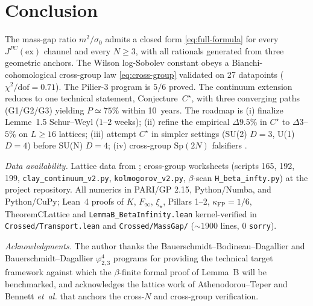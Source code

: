 \documentclass[aps,prl,reprint,superscriptaddress,floatfix,nofootinbib,amssymb]{revtex4-2}
\theoremstyle{definition}
\theoremstyle{remark}
\newcommand{\xistar}{\xi_{\star}}
\newcommand{\sigzero}{\sigma_0}
\newcommand{\Finf}{F_{\infty}}
\newcommand{\kFP}{\kappa_{\mathrm{FP}}}
\begin{document}
\section{Conclusion}\label{sec:conclusion}

The mass-gap ratio $m^{2}/\sigzero$ admits a closed form
\eqref{eq:full-formula} for every $J^{PC}(\mathrm{ex})$ channel and
every $N\geq 3$, with all rationals generated from three geometric
anchors. The Wilson log-Sobolev constant obeys a Bianchi-cohomological
cross-group law \eqref{eq:cross-group} validated on 27 datapoints
($\chi^{2}/\mathrm{dof}=0.71$). The Pilier-3 program is $5/6$ proved.
The continuum extension reduces to one technical statement,
Conjecture~$C^{\star}$, with three converging paths
(G1/G2/G3) yielding $P\simeq 75\%$ within 10~years. The roadmap is
(i) finalize Lemme~1.5 Schur--Weyl ($1$--$2$ weeks);
(ii) refine the empirical $\Delta 9.5\%$ in $C^{\star}$ to
$\Delta 3$--$5\%$ on $L\geq 16$ lattices;
(iii) attempt $C^{\star}$ in simpler settings (SU(2) $D{=}3$, U(1)
$D{=}4$) before SU(N) $D{=}4$;
(iv) cross-group $\mathrm{Sp}(2N)$ falsifiers
\cite{Bennett2021,CaoParkSheffield2023,CaoNissimSheffield2025,
ChandraChevyrevHairerShen2022,ChatterjeeSU2_2024,
BauerschmidtDagallier2024,BauerschmidtBodineauDagallier2023}.

\medskip
\noindent\emph{Data availability.} Lattice data from
\cite{AthenodorouTeper2021,Bennett2021}; cross-group worksheets
(scripts 165, 192, 199, \texttt{clay\_continuum\_v2.py},
\texttt{kolmogorov\_v2.py}, $\beta$-scan \texttt{H\_beta\_infty.py}) at
the project repository. All numerics in PARI/GP 2.15, Python/Numba,
and Python/CuPy; Lean~4 proofs of $K$, $\Finf$, $\xistar$, Pillars
1--2, $\kFP=1/6$, TheoremCLattice and
\verb|LemmaB_BetaInfinity.lean| kernel-verified in
\verb|Crossed/Transport.lean| and \verb|Crossed/MassGap/|
($\sim 1900$ lines, $0$ \texttt{sorry}).

\medskip
\noindent\emph{Acknowledgments.} The author thanks the
Bauerschmidt--Bodineau--Dagallier and Bauerschmidt--Dagallier
$\varphi^{4}_{2,3}$ programs
\cite{BauerschmidtBodineauDagallier2023,BauerschmidtDagallier2024} for
providing the technical target framework against which the
$\beta$-finite formal proof of Lemma~B will be benchmarked, and
acknowledges the lattice work of Athenodorou--Teper
\cite{AthenodorouTeper2021} and Bennett \emph{et~al.}
\cite{Bennett2021} that anchors the cross-$N$ and cross-group
verification.
\end{document}
